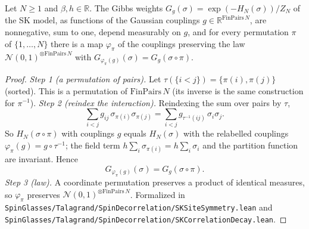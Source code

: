 \begin{lemma}\label{lem:sg-tal:sk-site-sym}
  \leanok
{}
Let $N\ge1$ and $\beta,h\in\mathbb R$. The Gibbs weights $G_g(\sigma)=\exp(-H_N(\sigma))/Z_N$ of the SK model, as functions of the Gaussian couplings $g\in\mathbb{R}^{\mathrm{FinPairs}\,N}$, are nonnegative, sum to one, depend measurably on $g$, and for every permutation $\pi$ of $\{1,\dots,N\}$ there is a map $\varphi_\pi$ of the couplings preserving the law $\mathcal N(0,1)^{\otimes\mathrm{FinPairs}\,N}$ with $G_{\varphi_\pi(g)}(\sigma)=G_g(\sigma\circ\pi)$.
\end{lemma}
\begin{proof}
\leanok
\emph{Step 1 (a permutation of pairs).} Let $\tau(\{i<j\})=\{\pi(i),\pi(j)\}$ (sorted). This is a permutation of $\mathrm{FinPairs}\,N$ (its inverse is the same construction for $\pi^{-1}$).
\emph{Step 2 (reindex the interaction).} Reindexing the sum over pairs by $\tau$,
\[
\sum_{i<j}g_{ij}\,\sigma_{\pi(i)}\sigma_{\pi(j)}=\sum_{i<j}g_{\tau^{-1}(ij)}\,\sigma_i\sigma_j .
\]
So $H_N(\sigma\circ\pi)$ with couplings $g$ equals $H_N(\sigma)$ with the relabelled couplings $\varphi_\pi(g)=g\circ\tau^{-1}$; the field term $h\sum_i\sigma_{\pi(i)}=h\sum_i\sigma_i$ and the partition function are invariant. Hence
\[
G_{\varphi_\pi(g)}(\sigma)=G_g(\sigma\circ\pi).
\]
\emph{Step 3 (law).} A coordinate permutation preserves a product of identical measures, so $\varphi_\pi$ preserves $\mathcal N(0,1)^{\otimes\mathrm{FinPairs}\,N}$.
Formalized in \texttt{SpinGlasses/Talagrand/SpinDecorrelation/SKSiteSymmetry.lean} and \texttt{SpinGlasses/Talagrand/SpinDecorrelation/SKCorrelationDecay.lean}.
\end{proof}

